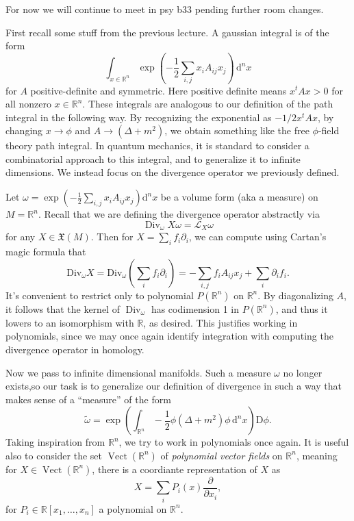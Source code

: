 
For now we will continue to meet in psy b33 pending further room changes.

First recall some stuff from the previous lecture. A gaussian integral is of the form
\[
	\int_{x\in\mathbb{R} ^n} \exp \left( -\frac{1}{2} \sum_{i,j} x_iA_{ij} x_j \right) \,\mathrm{d} ^nx
\]
for $A$ positive-definite and symmetric. Here positive definite means $x^tAx>0$ for all nonzero $x\in\mathbb{R} ^n$. These integrals are analogous to our definition of the path integral in the following way. By recognizing the exponential as $-1/2 x^tAx$, by changing $x\to \phi $ and $A\to (\Delta +m^2)$, we obtain something like the free $\phi $-field theory path integral. In quantum mechanics, it is standard to consider a combinatorial approach to this integral, and to generalize it to infinite dimensions. We instead focus on the divergence operator we previously defined.

Let $\omega =\exp \left( -\frac{1}{2} \sum_{i,j} x_i A_{ij} x_j \right) \mathrm{d} ^nx$ be a volume form (aka a measure) on $M=\mathbb{R} ^n$. Recall that we are defining the divergence operator abstractly via
\[
	\operatorname{Div} _\omega X \omega =\mathcal{L} _X\omega 
\]
for any $X\in \mathfrak{X} (M)$. Then for $X=\sum_{i} f_i \partial _i$, we can compute using Cartan's magic formula that
\[
	\mathrm{Div} _\omega X=\mathrm{Div}_\omega \left( \sum_{i} f_i \partial _i \right) =-\sum_{i,j} f_iA_{ij} x_j+\sum_{i} \partial _if_i
.\]
It's convenient to restrict only to polynomial $P(\mathbb{R} ^n)$ on $\mathbb{R} ^n$. By diagonalizing $A$, it follows that the kernel of $\operatorname{Div} _\omega $ has codimension 1 in $P(\mathbb{R} ^n)$, and thus it lowers to an isomorphism with $\mathbb{R} $, as desired. This justifies working in polynomials, since we may once again identify integration with computing the divergence operator in homology.

Now we pass to infinite dimensional manifolds. Such a measure $\omega $ no longer exists,so our task is to generalize our definition of divergence in such a way that makes sense of a ``measure'' of the form
\[
	\widetilde{\omega } =\exp \left( \int_{\mathbb{R} ^n} -\frac{1}{2} \phi (\Delta +m^2)\phi  \,\mathrm{d} ^nx \right) \mathrm{D} \phi 
.\]
Taking inspiration from $\mathbb{R} ^n$, we try to work in polynomials once again. It is useful also to consider the set $\operatorname{Vect} (\mathbb{R} ^n)$ of \emph{polynomial vector fields} on $\mathbb{R} ^n$, meaning for $X\in \operatorname{Vect} (\mathbb{R} ^n)$, there is a coordiante representation of $X$ as
\[
	X=\sum_{i} P_i(x)\frac{\partial }{\partial x_i} ,
\]
for $P_i\in\mathbb{R} [x_1, \ldots ,x_n]$ a polynomial on $\mathbb{R} ^n$.

